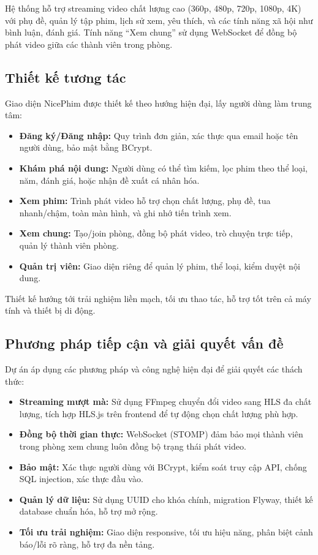 Hệ thống hỗ trợ streaming video chất lượng cao (360p, 480p, 720p, 1080p, 4K) với phụ đề, quản lý tập phim, lịch sử xem, yêu thích, và các tính năng xã hội như bình luận, đánh giá. Tính năng “Xem chung” sử dụng WebSocket để đồng bộ phát video giữa các thành viên trong phòng.


\subsection{Thiết kế tương tác}

Giao diện NicePhim được thiết kế theo hướng hiện đại, lấy người dùng làm trung tâm:
\begin{itemize}
	\item \textbf{Đăng ký/Đăng nhập:} Quy trình đơn giản, xác thực qua email hoặc tên người dùng, bảo mật bằng BCrypt.
	\item \textbf{Khám phá nội dung:} Người dùng có thể tìm kiếm, lọc phim theo thể loại, năm, đánh giá, hoặc nhận đề xuất cá nhân hóa.
	\item \textbf{Xem phim:} Trình phát video hỗ trợ chọn chất lượng, phụ đề, tua nhanh/chậm, toàn màn hình, và ghi nhớ tiến trình xem.
	\item \textbf{Xem chung:} Tạo/join phòng, đồng bộ phát video, trò chuyện trực tiếp, quản lý thành viên phòng.
	\item \textbf{Quản trị viên:} Giao diện riêng để quản lý phim, thể loại, kiểm duyệt nội dung.
\end{itemize}

Thiết kế hướng tới trải nghiệm liền mạch, tối ưu thao tác, hỗ trợ tốt trên cả máy tính và thiết bị di động.


\subsection{Phương pháp tiếp cận và giải quyết vấn đề}

Dự án áp dụng các phương pháp và công nghệ hiện đại để giải quyết các thách thức:
\begin{itemize}
	\item \textbf{Streaming mượt mà:} Sử dụng FFmpeg chuyển đổi video sang HLS đa chất lượng, tích hợp HLS.js trên frontend để tự động chọn chất lượng phù hợp.
	\item \textbf{Đồng bộ thời gian thực:} WebSocket (STOMP) đảm bảo mọi thành viên trong phòng xem chung luôn đồng bộ trạng thái phát video.
	\item \textbf{Bảo mật:} Xác thực người dùng với BCrypt, kiểm soát truy cập API, chống SQL injection, xác thực đầu vào.
	\item \textbf{Quản lý dữ liệu:} Sử dụng UUID cho khóa chính, migration Flyway, thiết kế database chuẩn hóa, hỗ trợ mở rộng.
	\item \textbf{Tối ưu trải nghiệm:} Giao diện responsive, tối ưu hiệu năng, phân biệt cảnh báo/lỗi rõ ràng, hỗ trợ đa nền tảng.
\end{itemize}

